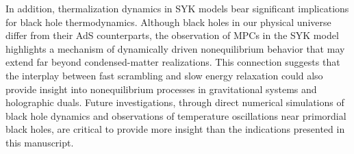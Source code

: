 \documentclass[prl,superscriptaddress,notitlepage,showpacs,twocolumn]{revtex4-2}
\begin{document}
In addition, thermalization dynamics in SYK models bear significant implications for black hole thermodynamics. Although black holes in our physical universe differ from their AdS counterparts, the observation of MPCs in the SYK model highlights a mechanism of dynamically driven nonequilibrium behavior that may extend far beyond condensed-matter realizations. This connection suggests that the interplay between fast scrambling and slow energy relaxation could also provide insight into nonequilibrium processes in gravitational systems and holographic duals.
Future investigations, through direct numerical simulations of black hole dynamics and observations of temperature oscillations near primordial black holes, are critical to provide more insight than the indications presented in this manuscript. %
\end{document}
